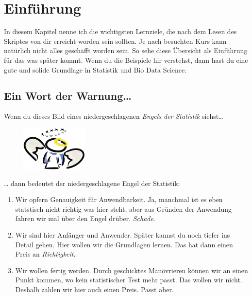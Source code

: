 \documentclass[
  letterpaper,
  DIV=11,
  oneside]{scrreport}
\providecommand{\tightlist}{%
  \setlength{\itemsep}{0pt}\setlength{\parskip}{0pt}}\usepackage{longtable,booktabs,array}
\begin{document}

\hypertarget{einfuxfchrung}{%
\chapter{Einführung}\label{einfuxfchrung}}

In diesem Kapitel nenne ich die wichtigsten Lernziele, die nach dem
Lesen des Skriptes von dir erreicht worden sein sollten. Je nach
besuchten Kurs kann natürlich nicht alles geschafft worden sein. So sehe
diese Übersicht als Einführung für das was später kommt. Wenn du die
Beispiele hir verstehst, dann hast du eine gute und solide Grundlage in
Statistik und Bio Data Science.

\hypertarget{ein-wort-der-warnung}{%
\section*{Ein Wort der Warnung\ldots{}}\label{ein-wort-der-warnung}}

Wenn du dieses Bild eines niedergeschlagenen \emph{Engels der Statistik}
siehst\ldots{}

\begin{figure}

{\centering \includegraphics[width=0.3\textwidth,height=\textheight]{./images/angel_01.png}

}

\end{figure}

\ldots{} dann bedeutet der niedergeschlagene Engel der Statistik:

\begin{enumerate}
\def\labelenumi{\arabic{enumi})}
\tightlist
\item
  Wir opfern Genauigkeit für Anwendbarkeit. Ja, manchmal ist es eben
  statstisch nicht richtig was hier steht, aber aus Gründen der
  Anwendung fahren wir mal über den Engel drüber. \emph{Schade}.
\item
  Wir sind hier Anfänger und Anwender. Später kannst du noch tiefer ins
  Detail gehen. Hier wollen wir die Grundlagen lernen. Das hat dann
  einen Preis an \emph{Richtigkeit}.
\item
  Wir wollen fertig werden. Durch geschicktes Manövrieren können wir an
  einen Punkt kommen, wo kein statistischer Test mehr passt. Das wollen
  wir nicht. Deshalb zahlen wir hier auch einen Preis. Passt aber.
\end{enumerate}
\end{document}
